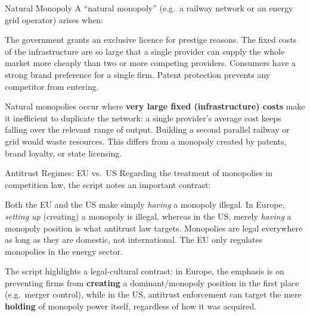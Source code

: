\begin{question}[type=mc]{Natural Monopoly}
A ``natural monopoly'' (e.g.\ a railway network or an energy grid operator)
arises when:
\begin{choices}
  \choice        The government grants an exclusive licence for prestige
                 reasons.
  \correctchoice The fixed costs of the infrastructure are so large that a
                 single provider can supply the whole market more cheaply
                 than two or more competing providers.
  \choice        Consumers have a strong brand preference for a single firm.
  \choice        Patent protection prevents any competitor from entering.
\end{choices}
\begin{solution}
  Natural monopolies occur where \textbf{very large fixed (infrastructure)
  costs} make it inefficient to duplicate the network: a single provider's
  average cost keeps falling over the relevant range of output. Building a
  second parallel railway or grid would waste resources. This differs from
  a monopoly created by patents, brand loyalty, or state licensing.
\end{solution}
\end{question}

\begin{question}[type=mc]{Antitrust Regimes: EU vs.\ US}
Regarding the treatment of monopolies in competition law, the script notes an
important contrast:
\begin{choices}
  \choice        Both the EU and the US make simply \emph{having} a monopoly
                 illegal.
  \correctchoice In Europe, \emph{setting up} (creating) a monopoly is
                 illegal, whereas in the US, merely \emph{having} a monopoly
                 position is what antitrust law targets.
  \choice        Monopolies are legal everywhere as long as they are
                 domestic, not international.
  \choice        The EU only regulates monopolies in the energy sector.
\end{choices}
\begin{solution}
  The script highlights a legal-cultural contrast: in Europe, the emphasis is
  on preventing firms from \textbf{creating} a dominant/monopoly position in
  the first place (e.g.\ merger control), while in the US, antitrust
  enforcement can target the mere \textbf{holding} of monopoly power itself,
  regardless of how it was acquired.
\end{solution}
\end{question}


